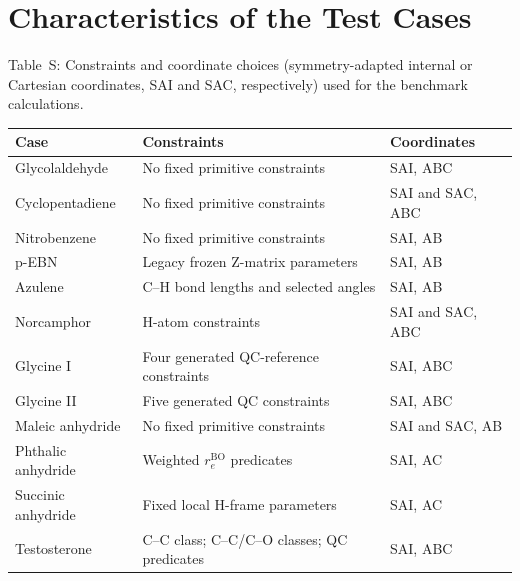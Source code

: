 \documentclass[12pt]{article}
\renewcommand{\thetable}{S\arabic{table}}
\begin{document}
\section{Characteristics of the Test Cases}

\begin{center}
\label{tab:si-reproducibility}
\parbox{0.94\linewidth}{\small Table~\thetable: Constraints and coordinate
choices (symmetry-adapted internal or Cartesian coordinates, SAI and SAC,
respectively) used for the benchmark calculations.}

\smallskip
\begin{tabular}{lll}
\toprule
Case & Constraints & Coordinates \\
\midrule
Glycolaldehyde  & No fixed primitive constraints         & SAI, ABC \\
Cyclopentadiene & No fixed primitive constraints         & SAI and SAC, ABC \\
Nitrobenzene    & No fixed primitive constraints         & SAI, AB \\
p-EBN           & Legacy frozen Z-matrix parameters      & SAI, AB \\
Azulene         & C--H bond lengths and selected angles  & SAI, AB \\
Norcamphor      & H-atom constraints                     & SAI and SAC, ABC \\
Glycine I       & Four generated QC-reference constraints        & SAI, ABC \\
Glycine II      & Five generated QC constraints      & SAI, ABC \\
Maleic anhydride & No fixed primitive constraints        & SAI and SAC, AB \\
Phthalic anhydride & Weighted $r_e^\mathrm{BO}$ predicates & SAI, AC \\
Succinic anhydride & Fixed local H-frame parameters       & SAI, AC \\
Testosterone & C--C class; C--C/C--O classes; QC predicates   & SAI, ABC \\
\bottomrule
\end{tabular}
\end{center}
\end{document}
